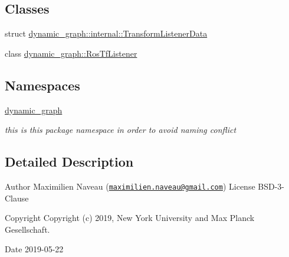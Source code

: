 \subsection*{Classes}
\begin{DoxyCompactItemize}
\item 
struct \hyperlink{structdynamic__graph_1_1internal_1_1TransformListenerData}{dynamic\+\_\+graph\+::internal\+::\+Transform\+Listener\+Data}
\item 
class \hyperlink{classdynamic__graph_1_1RosTfListener}{dynamic\+\_\+graph\+::\+Ros\+Tf\+Listener}
\end{DoxyCompactItemize}
\subsection*{Namespaces}
\begin{DoxyCompactItemize}
\item 
 \hyperlink{namespacedynamic__graph}{dynamic\+\_\+graph}
\begin{DoxyCompactList}\small\item\em this is this package namespace in order to avoid naming conflict \end{DoxyCompactList}\end{DoxyCompactItemize}


\subsection{Detailed Description}
\begin{DoxyAuthor}{Author}
Maximilien Naveau (\href{mailto:maximilien.naveau@gmail.com}{\tt maximilien.\+naveau@gmail.\+com})  License B\+S\+D-\/3-\/\+Clause 
\end{DoxyAuthor}
\begin{DoxyCopyright}{Copyright}
Copyright (c) 2019, New York University and Max Planck Gesellschaft. 
\end{DoxyCopyright}
\begin{DoxyDate}{Date}
2019-\/05-\/22 
\end{DoxyDate}
